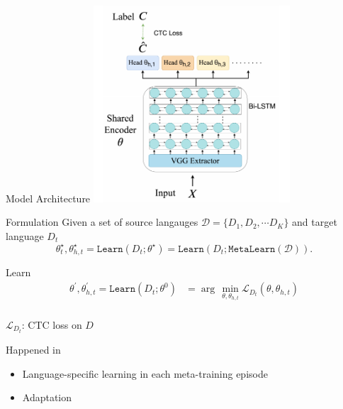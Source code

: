 \documentclass{beamer}
\begin{document}
\begin{frame}[t]{Model Architecture}
  \center \includegraphics[width=0.55\textwidth]{fig/model_arch.png}
\end{frame}

\begin{frame}[t]{Formulation}
  Given a set of source langauges $\mathcal{D} = \{D_1, D_2, \cdots D_K \}$ and target language $D_t$
  \begin{equation*}
    \theta^{\star}_t, \theta^{\star}_{h,t} = \texttt{Learn}(D_t;\theta^{\star}) = \texttt{Learn}(D_t;\texttt{MetaLearn}(\mathcal{D})).
  \end{equation*}

\end{frame}

\begin{frame}[t]{Learn}
\begin{equation*}
  \begin{aligned}
    \theta^\prime, \theta^\prime_{h,t} = \texttt{Learn}(D_t;\theta^0) & = \arg \, \min_{\theta, \theta_{h,t}} \mathcal{L}_{D_t}(\theta, \theta_{h,t}) \\
  \end{aligned}
\end{equation*}
  \vspace{1em}

  $\mathcal{L}_{D_t}$: CTC loss on $D$

  \vspace{2em}
  Happened in 
  \begin{itemize}
    \item Language-specific learning in each meta-training episode
    \item Adaptation
  \end{itemize}
\end{frame}
\end{document}
